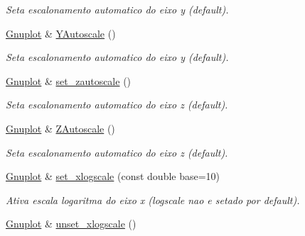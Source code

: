 \begin{DoxyCompactItemize}
\begin{DoxyCompactList}\small\item\em Seta escalonamento automatico do eixo y (default). \end{DoxyCompactList}\item 
\hypertarget{classGnuplot_a288c0be86e20ff6986f5b43cb69b2bb0}{\hyperlink{classGnuplot}{Gnuplot} \& \hyperlink{classGnuplot_a288c0be86e20ff6986f5b43cb69b2bb0}{Y\-Autoscale} ()}\label{classGnuplot_a288c0be86e20ff6986f5b43cb69b2bb0}

\begin{DoxyCompactList}\small\item\em Seta escalonamento automatico do eixo y (default). \end{DoxyCompactList}\item 
\hypertarget{classGnuplot_ad72aa208fad039b6b7d13ea9595ce157}{\hyperlink{classGnuplot}{Gnuplot} \& \hyperlink{classGnuplot_ad72aa208fad039b6b7d13ea9595ce157}{set\-\_\-zautoscale} ()}\label{classGnuplot_ad72aa208fad039b6b7d13ea9595ce157}

\begin{DoxyCompactList}\small\item\em Seta escalonamento automatico do eixo z (default). \end{DoxyCompactList}\item 
\hypertarget{classGnuplot_ac926d0513fa38b316be4c6acfc65ca80}{\hyperlink{classGnuplot}{Gnuplot} \& \hyperlink{classGnuplot_ac926d0513fa38b316be4c6acfc65ca80}{Z\-Autoscale} ()}\label{classGnuplot_ac926d0513fa38b316be4c6acfc65ca80}

\begin{DoxyCompactList}\small\item\em Seta escalonamento automatico do eixo z (default). \end{DoxyCompactList}\item 
\hypertarget{classGnuplot_aff546fad227d93babeb5d2cc9f047b89}{\hyperlink{classGnuplot}{Gnuplot} \& \hyperlink{classGnuplot_aff546fad227d93babeb5d2cc9f047b89}{set\-\_\-xlogscale} (const double base=10)}\label{classGnuplot_aff546fad227d93babeb5d2cc9f047b89}

\begin{DoxyCompactList}\small\item\em Ativa escala logaritma do eixo x (logscale nao e setado por default). \end{DoxyCompactList}\item 
\hypertarget{classGnuplot_aed8f962539fd8f53ab2c0218da7a6010}{\hyperlink{classGnuplot}{Gnuplot} \& \hyperlink{classGnuplot_aed8f962539fd8f53ab2c0218da7a6010}{unset\-\_\-xlogscale} ()}\label{classGnuplot_aed8f962539fd8f53ab2c0218da7a6010}


\end{DoxyCompactItemize}
